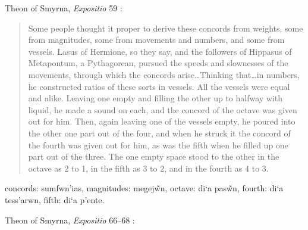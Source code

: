 \documentclass{amsart}
\newcommand{\textgreek}[1]{\begingroup\fontencoding{LGR}\selectfont#1\endgroup}
\theoremstyle{definition}
\begin{document}
Theon of Smyrna, {\em Expositio} 59 \cite[p.~218]{barker}:

\begin{quote}
Some people thought it proper to derive these concords from weights, some
from magnitudes, some from movements and numbers, and some from vessels.
Lasus of Hermione, so they say, and the followers of Hippasus of Metapontum,
a Pythagorean, pursued the speeds and slownesses of the movements, through
which the concords arise\dots Thinking that\dots in numbers, he constructed ratios
of these sorts in vessels. All the vessels were equal and alike. Leaving one
empty and filling the other up to halfway with liquid, he made a sound on each,
and the concord of the octave was given out for him. Then, again leaving one
of the vessels empty, he poured into the other one part out of the four, and
when he struck it the concord of the fourth was given out for him, as was the
fifth when he filled up one part out of the three. The one empty space stood
to the other in the octave as 2 to 1, in the fifth as 3 to 2, and in the fourth as
4 to 3.
\end{quote}

concords: \textgreek{sumfwn'ias},
magnitudes: \textgreek{megej\~wn},
octave: \textgreek{di`a pas\~wn},
fourth: \textgreek{di`a tess'arwn},
fifth: \textgreek{di`a p'ente}.  

Theon of Smyrna, {\em Expositio} 66--68 \cite[pp.~221--222]{barker}:
\end{document}
